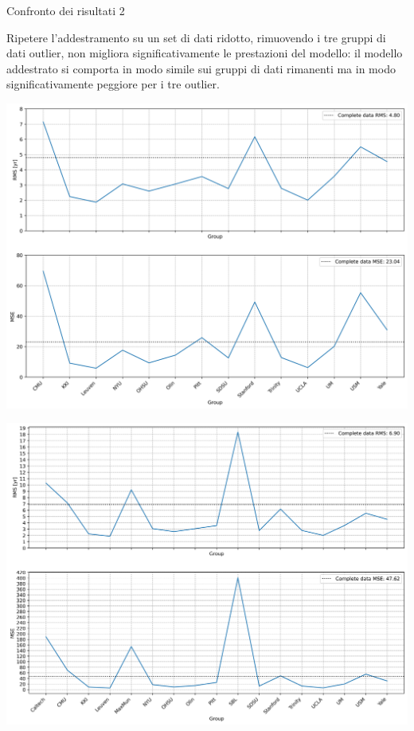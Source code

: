 \documentclass{beamer}
\begin{document}

\begin{frame}{Confronto dei risultati 2}

Ripetere l'addestramento su un set di dati ridotto, rimuovendo i tre gruppi di dati outlier, non migliora significativamente le prestazioni del modello: il modello addestrato si comporta in modo simile sui gruppi di dati rimanenti ma in modo significativamente peggiore per i tre outlier.

\begin{table}\centering
\begin{minipage}{0.45\textwidth}
	\includegraphics[width=\textwidth]{result_without_out.png}
\end{minipage}
\begin{minipage}{0.45\textwidth}
	\includegraphics[width=\textwidth]{result_without_out_overall.png}
\end{minipage}
\end{table}

\end{frame}
\end{document}
